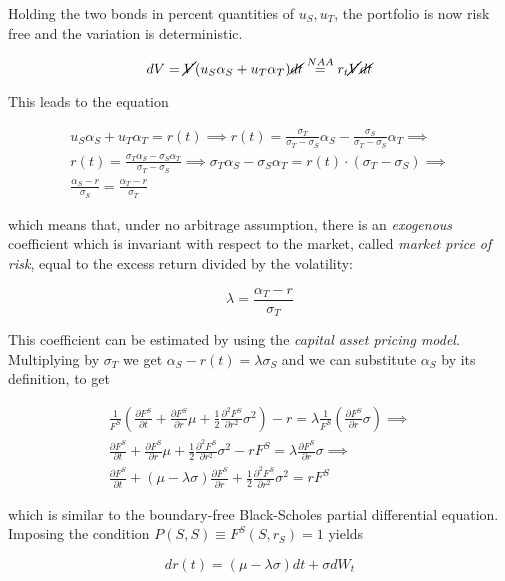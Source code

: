 \documentclass[oneside,titlepage,headinclude,12pt,a4paper,BCOR5mm,footinclude]{book}
\theoremstyle{defn}
\newcommand\de\partial
\begin{document}
Holding the two  bonds in percent quantities of $u_S,u_T$,  the portfolio is now
risk free and the variation is deterministic.

\[
  dV = \cancel{V}(u_S\alpha_S + u_T\alpha_T)\cancel{dt} \stackrel{NAA}{=} r_t\cancel{V}\cancel{dt}
\]

This leads to the equation

\begin{gather*}
  u_S\alpha_S + u_T\alpha_T = r(t) \implies
  r(t) = \frac{\sigma_T}{\sigma_T - \sigma_S} \alpha_S - \frac{\sigma_S}{\sigma_T - \sigma_S} \alpha_T
  \implies\\
  r(t) = \frac{\sigma_T\alpha_S - \sigma_S\alpha_T}{\sigma_T - \sigma_S}
  \implies
  \sigma_T\alpha_S - \sigma_S\alpha_T = r(t) \cdot (\sigma_T - \sigma_S)
  \implies\\
  \frac{\alpha_S - r}{\sigma_S} = \frac{\alpha_T - r}{\sigma_T}
\end{gather*}

which means that, under no  arbitrage assumption, there is an \textit{exogenous}
coefficient which is invariant with respect to the market, called \textit{market
price of risk}, equal to the excess return divided by the volatility:

\[
  \lambda = \frac{\alpha_T - r}{\sigma_T}
\]

This coefficient  can be  estimated by using  the \textit{capital  asset pricing
model}. Multiplying by $\sigma_T$ we get $\alpha_S - r(t) = \lambda\sigma_S$ and
we can substitute $\alpha_S$ by its definition, to get

\begin{gather*}
  \frac{1}{F^S}\left(\frac{\de F^S}{\de t} + \frac{\de F^S}{\de r} \mu + 
  \frac{1}{2} \frac{\de^2 F^S}{\de r^2} \sigma^2 \right) - r = \lambda\frac{1}{F^S}\left(\frac{\de F^S}{\de r}\sigma\right)
  \implies\\
  \frac{\de F^S}{\de t} + \frac{\de F^S}{\de r}\mu + \frac{1}{2}\frac{\de^2 F^S}{\de r^2}\sigma^2 - rF^S = \lambda \frac{\de F^S}{\de r}\sigma
  \implies\\
  \frac{\de F^S}{\de t} + (\mu - \lambda\sigma)\frac{\de F^S}{\de r} + \frac{1}{2} \frac{\de^2 F^S}{\de r^2}\sigma^2 = rF^S
\end{gather*}

which  is  similar  to  the  boundary-free  Black-Scholes  partial  differential
equation. Imposing the condition $P(S,S)\equiv F^S(S,r_S)=1$ yields

\[
  dr(t) = (\mu - \lambda\sigma)dt + \sigma dW_t
\]
\end{document}
